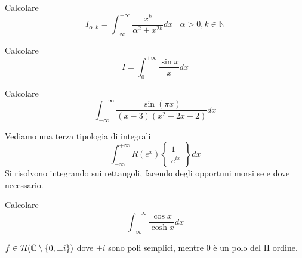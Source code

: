 \begin{figure}[htpb]
\end{figure}
\FloatBarrier
Calcolare
\begin{equation*}
I_{\alpha ,k} =\int ^{+\infty }_{-\infty }\frac{x^{k}}{\alpha ^{2} +x^{2k}} dx\ \ \ \ \alpha  >0,k\in \mathbb{N}
\end{equation*}
\Esercizio{}

Calcolare
\begin{equation*}
I=\int ^{+\infty }_{0}\frac{\sin x}{x} dx
\end{equation*}
\Esercizio{}

Calcolare
\begin{equation*}
\int ^{+\infty }_{-\infty }\frac{\sin\left( \pi x\right)}{\left( x-3\right)\left( x^{2} -2x+2\right)} dx
\end{equation*}
\Esercizio{}

Vediamo una terza tipologia di integrali
\begin{equation*}
\boxed{\int ^{+\infty }_{-\infty } R\left( e^{x}\right)\left\{\begin{array}{ c }
1\\
e^{ix}
\end{array}\right\} dx}
\end{equation*}
Si risolvono integrando sui rettangoli, facendo degli opportuni morsi se e dove necessario.

Calcolare
\begin{equation*}
\int ^{+\infty }_{-\infty }\frac{\cos x}{\cosh x} dx
\end{equation*}
\ParteSoluzioni
\Soluzione

$f\in \mathcal{H} (\mathbb{C} \setminus \{0,\pm i\})$ dove $\pm i$ sono poli semplici, mentre $0$ è un polo del II ordine. 


